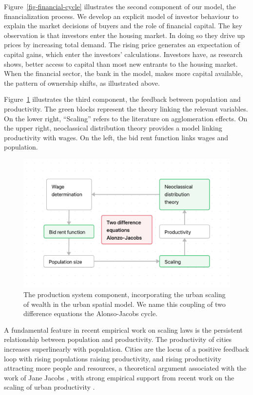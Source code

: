 Figure~\ref{fig-financial-cycle} illustrates the second component of our model, the financialization process. We develop an explicit model of investor behaviour to explain the market decisions of buyers and the role of financial capital. The key observation is that investors enter the housing market. In doing so they drive up prices by increasing total demand. The rising price generates an expectation of capital gains, which enter the investors' calculations. Investors have, as research shows, better access to capital than most new entrants to the housing market. When the financial sector, the bank in the model, makes more capital available, the pattern of ownership shifts, as illustrated above.

Figure~\ref{fig-alonso-jacobs-cycle} illustrates the third component, the feedback between population and productivity. The green blocks represent the theory linking the relevant variables.  On the lower right, ``Scaling'' refers to the literature on agglomeration effects. On the upper right, neoclassical distribution theory provides a model linking productivity with wages.  On the left, the bid rent function links wages and population.


\begin{figure}[!ht]
\centering
\includegraphics[scale=.7]{fig/flow-alonso-jacobs-cycle.png}
\caption[Production system.]{The production system component, incorporating the urban scaling of wealth in the urban spatial model. We name this coupling of two difference equations the Alonso-Jacobs cycle.}
\label{fig-alonso-jacobs-cycle}
\end{figure}

A fundamental feature in recent empirical work on scaling laws is the persistent relationship between population and productivity. The productivity of cities increases superlinearly with population. Cities are the locus of a positive feedback loop with rising populations raising productivity, and rising productivity attracting more people and resources, a theoretical argument associated with the work of Jane Jacobs \cite{jacobsEconomyCities1969}, with strong empirical support from recent work on the scaling of urban productivity  \cite{bettencourtGrowthInnovationScaling2007, bettencourtOriginsScalingCities2013, dongUnderstandingMesoscopicScaling2020, loboUrbanScalingProduction2013}.


